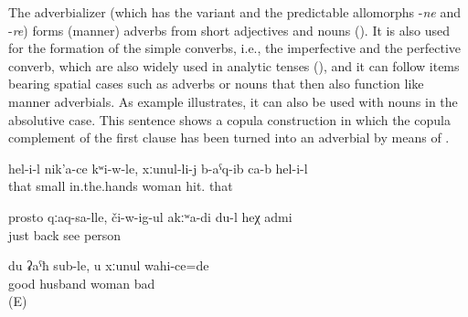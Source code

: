 The adverbializer  (which has the variant  and the predictable allomorphs -\textit{ne} and -\textit{re}) forms (manner) adverbs from short adjectives and nouns (). It is also used for the formation of the simple converbs, i.e., the imperfective and the perfective converb, which are also widely used in analytic tenses (), and it can follow items bearing spatial cases such as adverbs  or nouns  that then also function like manner adverbials. As example  illustrates, it can also be used with nouns in the absolutive case. This sentence shows a copula construction in which the copula complement of the first clause has been turned into an adverbial by means of .
%
\begin{exe}
	\ex	\label{ex:While she had the child in her arms, he hit his wife minor}
	\gll	hel-i-l	nik'a-ce	kʷi-w-le,	xːunul-li-j	b-aˁq-ib	ca-b	hel-i-l\\
		that	small	in.the.hands	woman	hit.		that\\
	\glt	{}

	\ex	\label{ex:‎‎Just with the back (turned to me), I do not see this person minor}
	\gll	prosto	qːaq-sa-lle,	či-w-ig-ul	akːʷa-di	du-l	heχ	admi\\
		just	back	see				person\\
	\glt	{}

	\ex	\label{ex:‎While I am a good husband, you are a bad wife minor}
	\gll	du	ʡaˁħ	sub-le,	u	xːunul	wahi-ce=de\\
			good	husband			woman	bad\\
	\glt	{} (E)
\end{exe}
